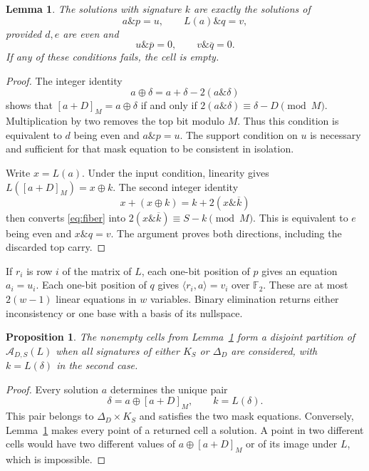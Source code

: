 \documentclass[11pt,a4paper]{article}
\newtheorem{proposition}[theorem]{Proposition}
\newtheorem{lemma}[theorem]{Lemma}
\theoremstyle{definition}\newtheorem{definition}[theorem]{Definition}
\newcommand{\F}{\mathbb F_2}
\newcommand{\andb}{\mathbin{\&}}
\newcommand{\res}[1]{[#1]_M}
\begin{document}
\begin{lemma}\label{lem:cell}
The solutions with signature $k$ are exactly the solutions of
\begin{equation}\label{eq:masks}
a\andb p=u,\qquad L(a)\andb q=v,
\end{equation}
provided $d,e$ are even and
\begin{equation}\label{eq:support}
u\andb\overline p=0,\qquad v\andb\overline q=0.
\end{equation}
If any of these conditions fails, the cell is empty.
\end{lemma}
\begin{proof}
The integer identity
\[
a\oplus\delta=a+\delta-2(a\andb\delta)
\]
shows that $\res{a+D}=a\oplus\delta$ if and only if
$2(a\andb\delta)\equiv\delta-D\pmod M$.
Multiplication by two removes the top bit modulo $M$. Thus this condition
is equivalent to $d$ being even and $a\andb p=u$.
The support condition on $u$ is necessary and sufficient for that mask
equation to be consistent in isolation.

Write $x=L(a)$. Under the input condition, linearity gives
$L(\res{a+D})=x\oplus k$. The second integer identity
\[
x+(x\oplus k)=k+2(x\andb\overline k)
\]
then converts \eqref{eq:fiber} into $2(x\andb\overline k)\equiv S-k\pmod M$.
This is equivalent to $e$ being even and $x\andb q=v$.
The argument proves both directions, including the discarded top carry.
\end{proof}

If $r_i$ is row $i$ of the matrix of $L$, each one-bit position of $p$
gives an equation $a_i=u_i$. Each one-bit position of $q$ gives
$\langle r_i,a\rangle=v_i$ over $\F$. These are at most $2(w-1)$ linear
equations in $w$ variables. Binary elimination returns either inconsistency
or one base with a basis of its nullspace.

\begin{proposition}\label{prop:partition}
The nonempty cells from Lemma~\ref{lem:cell} form a disjoint partition of
$\mathcal A_{D,S}(L)$ when all signatures of either $K_S$ or $\Delta_D$
are considered, with $k=L(\delta)$ in the second case.
\end{proposition}
\begin{proof}
Every solution $a$ determines the unique pair
\[
\delta=a\oplus\res{a+D},\qquad k=L(\delta).
\]
This pair belongs to $\Delta_D\times K_S$ and satisfies the two mask
equations. Conversely, Lemma~\ref{lem:cell} makes every point of a returned
cell a solution. A point in two different cells would have two different
values of $a\oplus\res{a+D}$ or of its image under $L$, which is impossible.
\end{proof}
\end{document}
